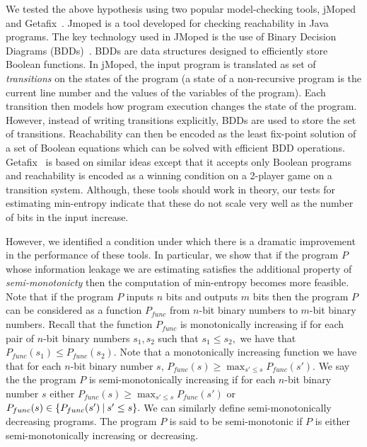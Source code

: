 We tested the above  hypothesis using two popular model-checking tools, jMoped~\cite{Jmoped} and Getafix~\cite{getafix}. 
Jmoped is a tool developed for checking reachability in Java programs. The key technology used in JMoped is the use of Binary Decision Diagrams (BDDs)~\cite{lee,Bry86}. BDDs are data structures designed to efficiently   store Boolean functions. In jMoped, the input program is translated  as set of \emph{transitions} on the states of the program (a state of a non-recursive program is the current line number and the values of the variables of the program). Each transition  then models how program execution changes the state of the program.  However, instead of writing transitions explicitly,
BDDs are used to store the set of transitions.  Reachability can then be encoded as  the least fix-point solution of a set of Boolean equations which can be solved with efficient BDD operations. Getafix~\cite{getafix} is based on similar ideas except that it accepts only Boolean programs and reachability is encoded as a winning condition on a 2-player game on a  transition system. Although, these tools should work in theory, our tests for estimating min-entropy indicate that these do not scale very well  as the number of bits in the input increase. 


However, we  identified a condition under which there is a dramatic improvement in the performance of these tools. In particular, we show that if the program $P$ whose information leakage we are estimating satisfies the additional property of \emph{semi-monotonicty} then the computation of min-entropy becomes more feasible. Note that  
  if the program $P$ inputs $n$ bits and outputs $m$ bits then the program $P$ can be considered as  a function $P_{func}$ from $n$-bit binary numbers to $m$-bit binary numbers. Recall that the function $P_{func}$ is monotonically increasing  if  for each pair of $n$-bit  binary numbers $s_1, s_2$  such that  $s_1\leq s_2,$ we have that $P_{func}(s_1) \leq P_{func}(s_2).$ Note that a monotonically increasing  function we have that for each $n$-bit binary number $s$, $P_{func}(s) \geq \max_{ s'\leq s} {P_{func}(s')}.$
    We say the the program $P$ is semi-monotonically increasing if for each $n$-bit  binary number $s$ either $P_{func}(s) \geq \max_{ s'\leq s}{P_{func}(s')}$ or $P_{func}(s) \in \{ P_{func}(s') \mathbin{|} s'\leq s \}.$ We can similarly define semi-monotonically decreasing programs. The program $P$ is said to be semi-monotonic if $P$ is either 
    semi-monotonically increasing or decreasing. 


